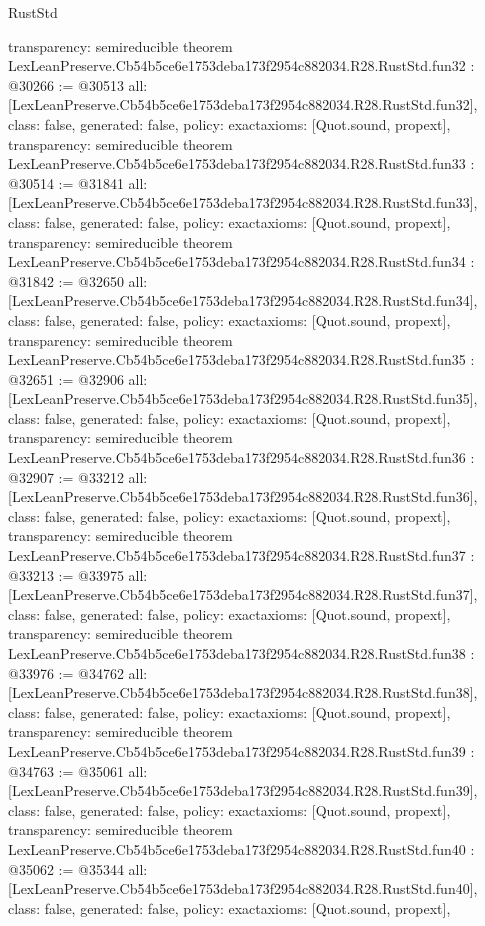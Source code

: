 \begin{lexlean}{RustStd}
\begin{coremodule}
{  transparency: semireducible
}
theorem LexLeanPreserve.Cb54b5ce6e1753deba173f2954c882034.R28.RustStd.fun32 : @30266 := @30513 {
  all: [LexLeanPreserve.Cb54b5ce6e1753deba173f2954c882034.R28.RustStd.fun32],
  class: false,
  generated: false,
  policy: exact{axioms: [Quot.sound, propext]},
  transparency: semireducible
}
theorem LexLeanPreserve.Cb54b5ce6e1753deba173f2954c882034.R28.RustStd.fun33 : @30514 := @31841 {
  all: [LexLeanPreserve.Cb54b5ce6e1753deba173f2954c882034.R28.RustStd.fun33],
  class: false,
  generated: false,
  policy: exact{axioms: [Quot.sound, propext]},
  transparency: semireducible
}
theorem LexLeanPreserve.Cb54b5ce6e1753deba173f2954c882034.R28.RustStd.fun34 : @31842 := @32650 {
  all: [LexLeanPreserve.Cb54b5ce6e1753deba173f2954c882034.R28.RustStd.fun34],
  class: false,
  generated: false,
  policy: exact{axioms: [Quot.sound, propext]},
  transparency: semireducible
}
theorem LexLeanPreserve.Cb54b5ce6e1753deba173f2954c882034.R28.RustStd.fun35 : @32651 := @32906 {
  all: [LexLeanPreserve.Cb54b5ce6e1753deba173f2954c882034.R28.RustStd.fun35],
  class: false,
  generated: false,
  policy: exact{axioms: [Quot.sound, propext]},
  transparency: semireducible
}
theorem LexLeanPreserve.Cb54b5ce6e1753deba173f2954c882034.R28.RustStd.fun36 : @32907 := @33212 {
  all: [LexLeanPreserve.Cb54b5ce6e1753deba173f2954c882034.R28.RustStd.fun36],
  class: false,
  generated: false,
  policy: exact{axioms: [Quot.sound, propext]},
  transparency: semireducible
}
theorem LexLeanPreserve.Cb54b5ce6e1753deba173f2954c882034.R28.RustStd.fun37 : @33213 := @33975 {
  all: [LexLeanPreserve.Cb54b5ce6e1753deba173f2954c882034.R28.RustStd.fun37],
  class: false,
  generated: false,
  policy: exact{axioms: [Quot.sound, propext]},
  transparency: semireducible
}
theorem LexLeanPreserve.Cb54b5ce6e1753deba173f2954c882034.R28.RustStd.fun38 : @33976 := @34762 {
  all: [LexLeanPreserve.Cb54b5ce6e1753deba173f2954c882034.R28.RustStd.fun38],
  class: false,
  generated: false,
  policy: exact{axioms: [Quot.sound, propext]},
  transparency: semireducible
}
theorem LexLeanPreserve.Cb54b5ce6e1753deba173f2954c882034.R28.RustStd.fun39 : @34763 := @35061 {
  all: [LexLeanPreserve.Cb54b5ce6e1753deba173f2954c882034.R28.RustStd.fun39],
  class: false,
  generated: false,
  policy: exact{axioms: [Quot.sound, propext]},
  transparency: semireducible
}
theorem LexLeanPreserve.Cb54b5ce6e1753deba173f2954c882034.R28.RustStd.fun40 : @35062 := @35344 {
  all: [LexLeanPreserve.Cb54b5ce6e1753deba173f2954c882034.R28.RustStd.fun40],
  class: false,
  generated: false,
  policy: exact{axioms: [Quot.sound, propext]},
}
\end{coremodule}
\end{lexlean}
